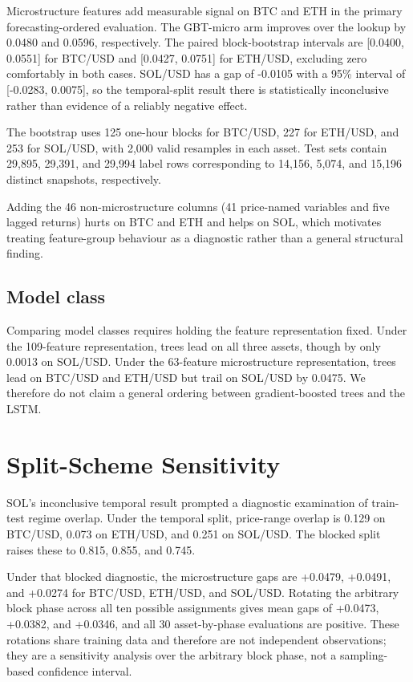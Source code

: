 \documentclass[11pt]{article}
\begin{document}
Microstructure features add measurable signal on BTC and ETH in the primary forecasting-ordered evaluation. The GBT-micro arm improves over the lookup by 0.0480 and 0.0596, respectively. The paired block-bootstrap intervals are [0.0400, 0.0551] for BTC/USD and [0.0427, 0.0751] for ETH/USD, excluding zero comfortably in both cases. SOL/USD has a gap of -0.0105 with a 95\% interval of [-0.0283, 0.0075], so the temporal-split result there is statistically inconclusive rather than evidence of a reliably negative effect.

The bootstrap uses 125 one-hour blocks for BTC/USD, 227 for ETH/USD, and 253 for SOL/USD, with 2,000 valid resamples in each asset. Test sets contain 29,895, 29,391, and 29,994 label rows corresponding to 14,156, 5,074, and 15,196 distinct snapshots, respectively.

Adding the 46 non-microstructure columns (41 price-named variables and five lagged returns) hurts on BTC and ETH and helps on SOL, which motivates treating feature-group behaviour as a diagnostic rather than a general structural finding.

\subsection{Model class}
Comparing model classes requires holding the feature representation fixed. Under the 109-feature representation, trees lead on all three assets, though by only 0.0013 on SOL/USD. Under the 63-feature microstructure representation, trees lead on BTC/USD and ETH/USD but trail on SOL/USD by 0.0475. We therefore do not claim a general ordering between gradient-boosted trees and the LSTM.

\section{Split-Scheme Sensitivity}
SOL's inconclusive temporal result prompted a diagnostic examination of train-test regime overlap. Under the temporal split, price-range overlap is 0.129 on BTC/USD, 0.073 on ETH/USD, and 0.251 on SOL/USD. The blocked split raises these to 0.815, 0.855, and 0.745.

Under that blocked diagnostic, the microstructure gaps are +0.0479, +0.0491, and +0.0274 for BTC/USD, ETH/USD, and SOL/USD. Rotating the arbitrary block phase across all ten possible assignments gives mean gaps of +0.0473, +0.0382, and +0.0346, and all 30 asset-by-phase evaluations are positive. These rotations share training data and therefore are not independent observations; they are a sensitivity analysis over the arbitrary block phase, not a sampling-based confidence interval.
\end{document}
